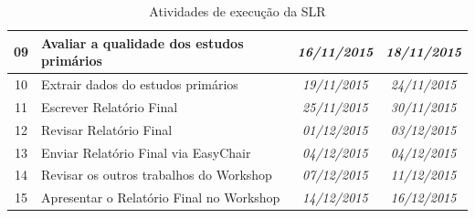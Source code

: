 \documentclass{article}
\begin{document}
\begin{table}[htb]
{\begin{tabular}{|c|l|c|c|}
09          & Avaliar a qualidade dos estudos primários                                                                                                 & \textit{16/11/2015}                              & \textit{18/11/2015}                               \\ \hline
10          & Extrair dados do estudos primários                                                                                                        & \textit{19/11/2015}                              & \textit{24/11/2015}                               \\ \hline
11          & Escrever Relatório Final                                                                                                                  & \textit{25/11/2015}                              & \textit{30/11/2015}                               \\ \hline
12          & Revisar Relatório Final                                                                                                                   & \textit{01/12/2015}                              & \textit{03/12/2015}                               \\ \hline
13          & Enviar Relatório Final via EasyChair                                                                                                      & \textit{04/12/2015}                              & \textit{04/12/2015}                               \\ \hline
14          & Revisar os outros trabalhos do Workshop                                                                                                   & \textit{07/12/2015}                              & \textit{11/12/2015}                               \\ \hline
15          & Apresentar o Relatório Final no Workshop                                                                                                  & \textit{14/12/2015}                              & \textit{16/12/2015}                               \\ \hline
\end{tabular}
}
\caption{Atividades de execução da SLR}
\label{tab:cronograma}
\end{table}

\medskip

\end{document}

